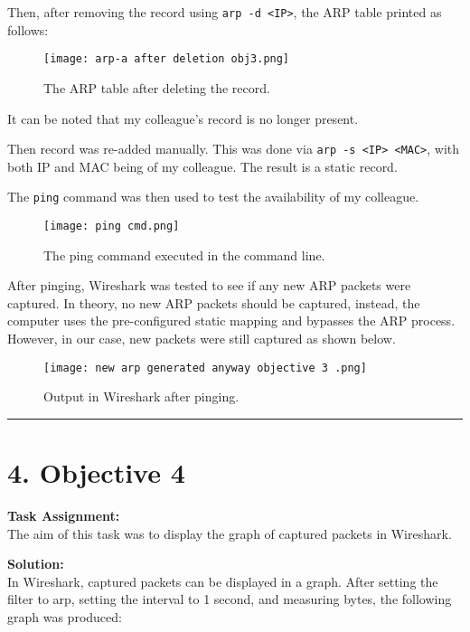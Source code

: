 \documentclass[a4paper,12pt]{article}
\begin{document}
Then, after removing the record using \texttt{arp -d <IP>}, the ARP table printed as follows:
\begin{figure}[H]
\centering
\texttt{[image: arp-a after deletion obj3.png]}
\caption{The ARP table after deleting the record.}
\end{figure}

It can be noted that my colleague's record is no longer present.

Then record was re-added manually.
This was done via \texttt{arp -s <IP> <MAC>}, with both IP and MAC being of my colleague. The result is a static record.

The \texttt{ping} command was then used to test the availability of my colleague.

\begin{figure}[H]
\centering
\texttt{[image: ping cmd.png]}
\caption{The ping command executed in the command line.}
\end{figure}

After pinging, Wireshark was tested to see if any new ARP packets were captured. In theory, no new ARP packets should be captured, instead, the computer uses the pre-configured static mapping and bypasses the ARP process.
However, in our case, new packets were still captured as shown below. 
\begin{figure}[H]
\centering
\texttt{[image: new arp generated anyway objective 3 .png]}
\caption{Output in Wireshark after pinging.}
\end{figure}

\vspace{1em}
\hrule
\vspace{0.5em}
\pagebreak

\section*{4. Objective 4}

\textbf{Task Assignment:} \\
The aim of this task was to display the graph of captured packets in Wireshark.

\textbf{Solution:} \\
In Wireshark, captured packets can be displayed in a graph. After setting the filter to arp, setting the interval to 1 second, and measuring bytes, the following graph was produced:
\end{document}
